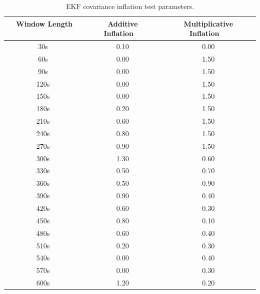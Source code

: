 \documentclass[12pt]{report}
\begin{document}
\begin{table}[h!]
\caption[EKF covariance inflation test parameters]{EKF covariance inflation test parameters.}
\begin{center}
\begin{tabular}{ccc}
\hline
{\bf Window Length ~~~~} & {\bf Additive Inflation~~} & {\bf Multiplicative Inflation~~}\\
\hline
\hline
~30s ~& 0.10 & 0.00 \\ \hline
~60s ~& 0.00 & 1.50 \\ \hline
~90s ~& 0.00 & 1.50 \\ \hline
~120s ~& 0.00 & 1.50 \\ \hline
~150s ~& 0.00 & 1.50 \\ \hline
~180s ~& 0.20 & 1.50 \\ \hline
~210s ~& 0.60 & 1.50 \\ \hline
~240s ~& 0.80 & 1.50 \\ \hline
~270s ~& 0.90 & 1.50 \\ \hline
~300s ~& 1.30 & 0.60 \\ \hline
~330s ~& 0.50 & 0.70 \\ \hline
~360s ~& 0.50 & 0.90 \\ \hline
~390s ~& 0.90 & 0.40 \\ \hline
~420s ~& 0.60 & 0.30 \\ \hline
~450s ~& 0.80 & 0.10 \\ \hline
~480s ~& 0.60 & 0.40 \\ \hline
~510s ~& 0.20 & 0.30 \\ \hline
~540s ~& 0.00 & 0.40 \\ \hline
~570s ~& 0.00 & 0.30 \\ \hline
~600s ~& 1.20 & 0.20 \\ 
\hline
\end{tabular}
\end{center}
\label{table:EKFCovInfl}
\end{table} 
\end{document}
